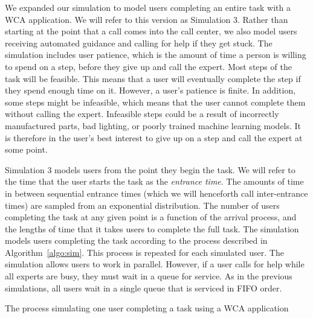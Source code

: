 We expanded our simulation to model users completing an entire task with a WCA
application.
We will refer to this version as Simulation 3.
Rather than starting at the point that a call comes into the call center, we
also model users receiving automated guidance and calling for help if they get
stuck.
The simulation includes user patience, which is the amount of time a person is
willing to spend on a step, before they give up and call the expert.
Most steps of the task will be feasible.
This means that a user will eventually complete the step if they spend enough
time on it.
However, a user's patience is finite.
In addition, some steps might be infeasible, which means that the user cannot
complete them without calling the expert.
Infeasible steps could be a result of incorrectly manufactured parts, bad
lighting, or poorly trained machine learning models.
It is therefore in the user's best interest to give up on a step and call the
expert at some point.

Simulation 3 models users from the point they begin the task.
We will refer to the time that the user starts the task as the
\emph{entrance time}.
The amounts of time in between sequential entrance times (which we will
henceforth call inter-entrance times) are sampled from an exponential
distribution.
The number of users completing the task at any given point is a function of the
arrival process, and the lengths of time that it takes users to complete the
full task.
The simulation models users completing the task according to the process
described in Algorithm~\ref{algo:sim}.
This process is repeated for each simulated user.
The simulation allows users to work in parallel.
However, if a user calls for help while all experts are busy, they must wait in
a queue for service.
As in the previous simulations, all users wait in a single queue that is
serviced in FIFO order.

\begin{algorithm}[H]
  \caption{
    The process simulating one user completing a task using a WCA application
  }\label{algo:sim}
\end{algorithm}

